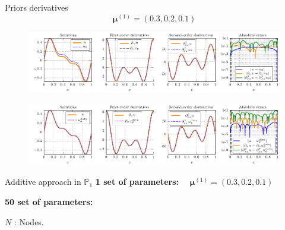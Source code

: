 \begin{appendixframe}{Priors derivatives}
	\vspace{-10pt}
	$$\bm{\mu}^{(1)}=(0.3,0.2,0.1)$$
	\begin{figure}[ht!]
		\centering
		\includegraphics[width=0.95\linewidth]{images/appendix/datavspinns/standalone_solutions_and_errors_PINN.pdf}
	\end{figure}
	
	\begin{figure}[ht!]
		\centering
		\includegraphics[width=0.95\linewidth]{images/appendix/datavspinns/standalone_solutions_and_errors_NN.pdf}
	\end{figure}
\end{appendixframe}

\begin{appendixframe}{Additive approach in $\mathbb{P}_1$}
	\vspace{-2pt}
	\textbf{1 set of parameters:} $\quad \bm{\mu}^{(1)}=(0.3,0.2,0.1)$
	
	\begin{table}[H]
		\centering
	\end{table}

	\vspace{6pt}
	\textbf{50 set of parameters:}

	\begin{table}[H]
		\centering
	\end{table}

	\footnotesize
	$N$ : Nodes.
\end{appendixframe}